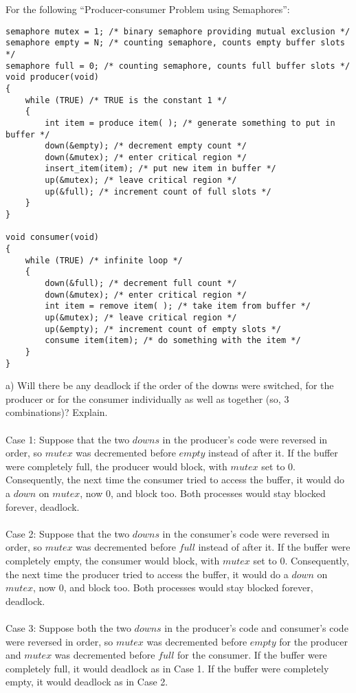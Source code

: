 \documentclass[12pt]{article}
\newenvironment{problem}[2][Problem]{\begin{trivlist}
\item[\hskip \labelsep {\bfseries #1}\hskip \labelsep {\bfseries #2.}]}{\end{trivlist}}
\begin{document}
\pagebreak
\begin{problem}{4}
For the following “Producer-consumer Problem using Semaphores”:
\begin{verbatim}
semaphore mutex = 1; /* binary semaphore providing mutual exclusion */
semaphore empty = N; /* counting semaphore, counts empty buffer slots */
semaphore full = 0; /* counting semaphore, counts full buffer slots */
void producer(void)
{
    while (TRUE) /* TRUE is the constant 1 */
    {
        int item = produce item( ); /* generate something to put in buffer */
        down(&empty); /* decrement empty count */
        down(&mutex); /* enter critical region */
        insert_item(item); /* put new item in buffer */
        up(&mutex); /* leave critical region */
        up(&full); /* increment count of full slots */
    }
}

void consumer(void)
{
    while (TRUE) /* infinite loop */
    {
        down(&full); /* decrement full count */
        down(&mutex); /* enter critical region */
        int item = remove item( ); /* take item from buffer */
        up(&mutex); /* leave critical region */
        up(&empty); /* increment count of empty slots */
        consume item(item); /* do something with the item */
    }
}
\end{verbatim}
a) Will there be any deadlock if the order of the downs were switched, for the producer or for the consumer individually as well as together (so, 3 combinations)? Explain.\\\\
Case 1: Suppose that the two $downs$ in the producer's code
were reversed in order, so $mutex$ was decremented before $empty$ instead of after it.
If the buffer were completely full, the producer would block, with $mutex$ set to 0.
Consequently, the next time the consumer tried to access the buffer, it would do a
$down$ on $mutex$, now 0, and block too. Both processes would stay blocked forever, deadlock.\\\\
Case 2: Suppose that the two $downs$ in the consumer's code
were reversed in order, so $mutex$ was decremented before $full$ instead of after it.
If the buffer were completely empty, the consumer would block, with $mutex$ set to 0.
Consequently, the next time the producer tried to access the buffer, it would do a
$down$ on $mutex$, now 0, and block too. Both processes would stay blocked forever, deadlock.\\\\
Case 3: Suppose both the two $downs$ in the producer's code and consumer's code were reversed in order,
so $mutex$ was decremented before $empty$ for the producer and $mutex$ was decremented before $full$ for the consumer.
If the buffer were completely full, it would deadlock as in Case 1. If the buffer were completely empty, it would deadlock as in Case 2.
\end{problem}
\end{document}
